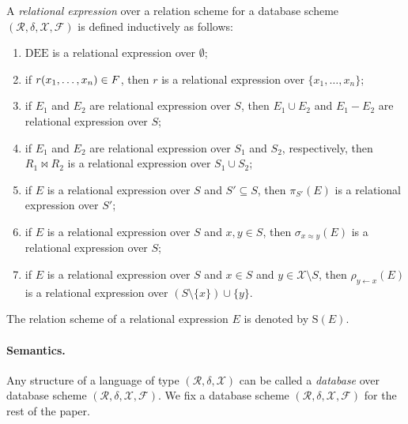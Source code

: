 \documentclass{lmcs}
\def\tu#1{( #1)}
\def\S{\textrm{S}}
\def\R{\mathcal R}
\def\X{\mathcal X}
\def\F{\mathcal F}
\def\DEE{\textrm{DEE}}
\begin{document}
A \emph{relational expression} over a relation scheme for a database scheme  $\tu{\R,\delta,\X,\F}$ is defined inductively  as follows:
\begin{enumerate}
\item $\DEE$ is a relational expression over $\emptyset$;
\item if $r(x_1,\ldots,x_n)\in\mathcal\F$, then $r$ is a relational expression over $\{x_1,\ldots, x_n\}$;
\item if $E_1$ and $E_2$ are relational expression over $S$, then $E_1\cup E_2$ and $E_1-E_2$ are relational expression over $S$;
\item if $E_1$ and $E_2$ are relational expression over $S_1$ and $S_2$, respectively, then $R_1\bowtie R_2$ is a relational expression over $S_1\cup S_2$;
\item if $E$ is a relational expression over $S$ and $S'\subseteq S$, then $\pi_{S'}(E)$ is a relational expression over $S'$;
\item if $E$ is a relational expression over $S$ and $x,y\in S$, then $\sigma_{x\approx y}(E)$ is a relational expression over $S$;
\item if $E$ is a relational expression over $S$ and $x\in S$ and $y\in \X\setminus S$, then $\rho_{y\leftarrow x}(E)$ is a relational expression over $(S\setminus\{x\})\cup\{y\}$.
\end{enumerate}
The relation scheme of a relational expression $E$ is denoted by $\S(E)$.


\paragraph{Semantics.} Any structure of a language of type $\tu{\R,\delta, \X}$ can be called a \emph{database} over database scheme $\tu{\R,\delta,\X,\F}$.  We fix a database scheme $\tu{\R,\delta,\X,\F}$ for the rest of the paper. 
\end{document}
